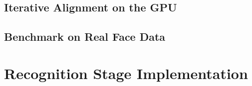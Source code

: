 \documentclass[10pt,twocolumn,letterpaper]{article}
\begin{document}
\subsection{Iterative Alignment on the GPU}

\subsection{Benchmark on Real Face Data}


\section{Recognition Stage Implementation}

\end{document}

